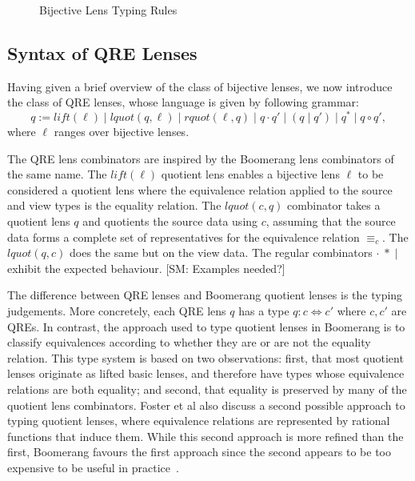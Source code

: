 \documentclass{svproc}
\newcommand{\FINISH}[3]{\ifdraft\textcolor{#1}{[#2: #3]}\fi}
\newcommand{\sam}[1]{\FINISH{dkpurple}{SM}{#1}}
\newcommand{\sep}{\ensuremath{\; | \;}}
\newcommand{\eqrel}[1]{\ensuremath{\equiv_{#1}}}
\begin{document}
\begin{figure}[t]
  \begin{prooftree}
  \end{prooftree}

  \begin{prooftree}
  \end{prooftree}
  \caption{Bijective Lens Typing Rules}
  \label{fig:lensrules}
\end{figure}

\subsection{Syntax of QRE Lenses}
Having given a brief overview of the class of bijective lenses, we now introduce
the class of QRE lenses, whose language is given by following grammar:
$$ q := \mathit{lift}(\ell) \sep \mathit{lquot}(q, \ell) \sep
\mathit{rquot}(\ell, q) \sep q \cdot q' \sep (q \sep q') \sep q^* \sep q \circ q',$$
where $\ell$ ranges over bijective lenses.

The QRE lens combinators are inspired by the Boomerang lens combinators of the
same name. The $\mathit{lift}(\ell)$ quotient lens enables a bijective lens
$\ell$ to be considered a quotient lens where the equivalence relation applied
to the source and view types is the equality relation. The $\mathit{lquot}(c,
q)$ combinator takes a quotient lens $q$ and quotients the source data using
$c$, assuming that the source data forms a complete set of representatives for
the equivalence relation $\eqrel{c}$. The $\mathit{lquot}(q, c)$ does the same
but on the view data. The regular combinators $\cdot \; * \; |$ exhibit the
expected behaviour. \sam{Examples needed?}

The difference between QRE lenses and Boomerang quotient lenses is the typing
judgements. More concretely, each QRE lens $q$ has a type $q : c \Leftrightarrow
c'$ where $c, c'$ are QREs. In contrast, the approach used to type quotient
lenses in Boomerang is to classify equivalences according to whether they are
or are not the equality relation. This type system is based on two
observations: first, that most quotient lenses originate as lifted basic
lenses, and therefore have types whose equivalence relations are both equality;
and second, that equality is preserved by many of the quotient lens
combinators. Foster et al also discuss a second possible approach to typing
quotient lenses, where equivalence relations are represented by rational
functions that induce them. While this second approach is more refined than the
first, Boomerang favours the first approach since the second appears to be too
expensive to be useful in practice~\cite{quotientlenses}.
\end{document}
